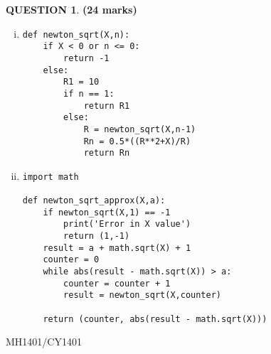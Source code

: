 \documentclass[a4paper,12pt]{article}
\theoremstyle{definition}
\newtheorem{ques}[dummy]{QUESTION}
\theoremstyle{plain}
\newcommand{\py}{python}
\begin{document}
	\begin{ques}\hfill\textbf{(24 marks)}\\
		\begin{enumerate}[(i)]
			\item 
			\begin{verbatim}
def newton_sqrt(X,n):
    if X < 0 or n <= 0:
        return -1
    else:
        R1 = 10
        if n == 1:
            return R1
        else:
            R = newton_sqrt(X,n-1)
            Rn = 0.5*((R**2+X)/R)
            return Rn
			\end{verbatim}
			\item
			\begin{verbatim}
import math

def newton_sqrt_approx(X,a):
    if newton_sqrt(X,1) == -1
        print('Error in X value')
        return (1,-1)
    result = a + math.sqrt(X) + 1
    counter = 0
    while abs(result - math.sqrt(X)) > a:
        counter = counter + 1
        result = newton_sqrt(X,counter)
        
    return (counter, abs(result - math.sqrt(X)))
			\end{verbatim}
		\end{enumerate}
	\end{ques}
	
	\newpage
	\hfill MH1401/CY1401\vspace*{0.5em}
	
\end{document}
